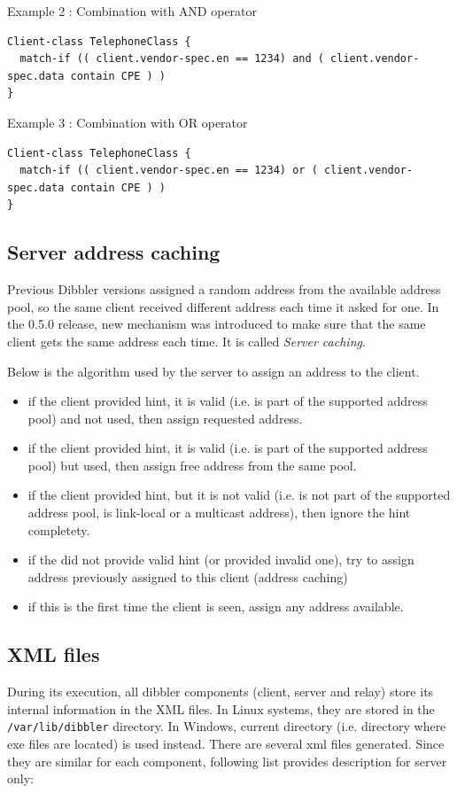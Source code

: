 Example 2 : Combination with AND operator
\begin{lstlisting}
Client-class TelephoneClass {
  match-if (( client.vendor-spec.en == 1234) and ( client.vendor-spec.data contain CPE ) )
}
\end{lstlisting}

Example 3 : Combination with OR operator
\begin{lstlisting}
Client-class TelephoneClass {
  match-if (( client.vendor-spec.en == 1234) or ( client.vendor-spec.data contain CPE ) )
}
\end{lstlisting}

\subsection{Server address caching}
Previous Dibbler versions assigned a random address from the available
address pool, so the same client received different address each time it
asked for one. In the 0.5.0 release, new mechanism was introduced
to make sure that the same client gets the same address each time. It is
called \emph{Server caching}.

Below is the algorithm used by the server to assign an address to the client.

\begin{itemize}
 \item if the client provided hint, it is valid (i.e. is part of the
       supported address pool) and not used, then assign requested address.
 \item if the client provided hint, it is valid (i.e. is part of the 
       supported address pool) but used, then assign free address from
       the same pool.
 \item if the client provided hint, but it is not valid (i.e. is not
       part of the supported address pool, is link-local or a multicast
       address), then ignore the hint completety.
 \item if the did not provide valid hint (or provided invalid one), try
       to assign address previously assigned to this client (address caching)
 \item if this is the first time the client is seen, assign any address
       available.
\end{itemize}


\subsection{XML files}
\label{features-xml}
During its execution, all dibbler components (client, server and
relay) store its internal information in the XML files. In Linux
systems, they are stored in the \verb+/var/lib/dibbler+ directory. In
Windows, current directory (i.e. directory where exe files are
located) is used instead. There are several xml files generated. Since
they are similar for each component, following list provides
description for server only:

